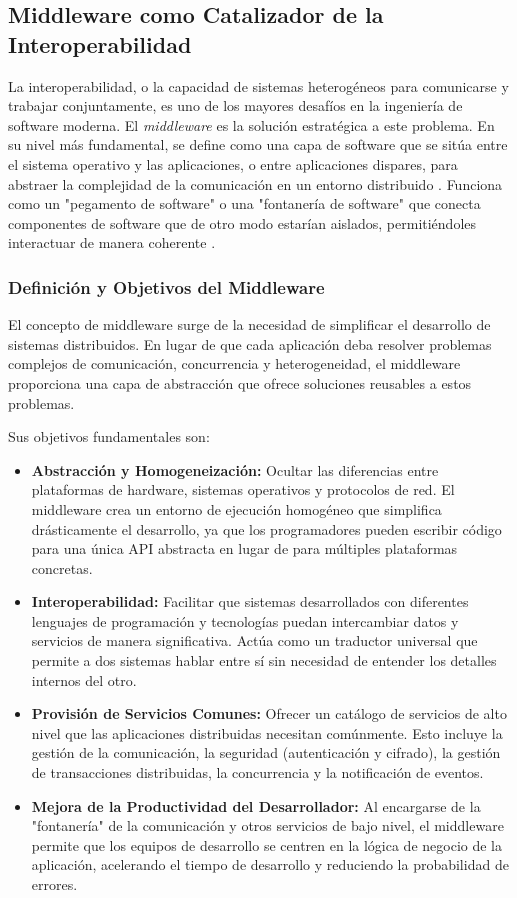 \subsection{Middleware como Catalizador de la Interoperabilidad}
La interoperabilidad, o la capacidad de sistemas heterogéneos para comunicarse y trabajar conjuntamente, es uno de los mayores desafíos en la ingeniería de software moderna. El \textit{middleware} es la solución estratégica a este problema. En su nivel más fundamental, se define como una capa de software que se sitúa entre el sistema operativo y las aplicaciones, o entre aplicaciones dispares, para abstraer la complejidad de la comunicación en un entorno distribuido \cite{e-g-2008middleware}. Funciona como un "pegamento de software" o una "fontanería de software" que conecta componentes de software que de otro modo estarían aislados, permitiéndoles interactuar de manera coherente \cite{bernstein1996middleware}.

\subsubsection{Definición y Objetivos del Middleware}
El concepto de middleware surge de la necesidad de simplificar el desarrollo de sistemas distribuidos. En lugar de que cada aplicación deba resolver problemas complejos de comunicación, concurrencia y heterogeneidad, el middleware proporciona una capa de abstracción que ofrece soluciones reusables a estos problemas.

Sus objetivos fundamentales son:
\begin{itemize}
    \item \textbf{Abstracción y Homogeneización:} Ocultar las diferencias entre plataformas de hardware, sistemas operativos y protocolos de red. El middleware crea un entorno de ejecución homogéneo que simplifica drásticamente el desarrollo, ya que los programadores pueden escribir código para una única API abstracta en lugar de para múltiples plataformas concretas.
    \item \textbf{Interoperabilidad:} Facilitar que sistemas desarrollados con diferentes lenguajes de programación y tecnologías puedan intercambiar datos y servicios de manera significativa. Actúa como un traductor universal que permite a dos sistemas hablar entre sí sin necesidad de entender los detalles internos del otro.
    \item \textbf{Provisión de Servicios Comunes:} Ofrecer un catálogo de servicios de alto nivel que las aplicaciones distribuidas necesitan comúnmente. Esto incluye la gestión de la comunicación, la seguridad (autenticación y cifrado), la gestión de transacciones distribuidas, la concurrencia y la notificación de eventos.
    \item \textbf{Mejora de la Productividad del Desarrollador:} Al encargarse de la "fontanería" de la comunicación y otros servicios de bajo nivel, el middleware permite que los equipos de desarrollo se centren en la lógica de negocio de la aplicación, acelerando el tiempo de desarrollo y reduciendo la probabilidad de errores.
\end{itemize}

